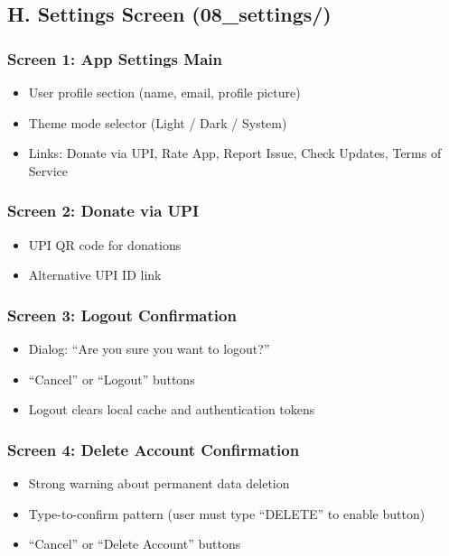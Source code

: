 \subsection{H. Settings Screen (08\_settings/)}

\subsubsection{Screen 1: App Settings Main}
\begin{itemize}
    \item User profile section (name, email, profile picture)
    \item Theme mode selector (Light / Dark / System)
    \item Links: Donate via UPI, Rate App, Report Issue, Check Updates, Terms of Service
\end{itemize}

\subsubsection{Screen 2: Donate via UPI}
\begin{itemize}
    \item UPI QR code for donations
    \item Alternative UPI ID link
\end{itemize}

\subsubsection{Screen 3: Logout Confirmation}
\begin{itemize}
    \item Dialog: ``Are you sure you want to logout?''
    \item ``Cancel'' or ``Logout'' buttons
    \item Logout clears local cache and authentication tokens
\end{itemize}

\subsubsection{Screen 4: Delete Account Confirmation}
\begin{itemize}
    \item Strong warning about permanent data deletion
    \item Type-to-confirm pattern (user must type ``DELETE'' to enable button)
    \item ``Cancel'' or ``Delete Account'' buttons
\end{itemize}

